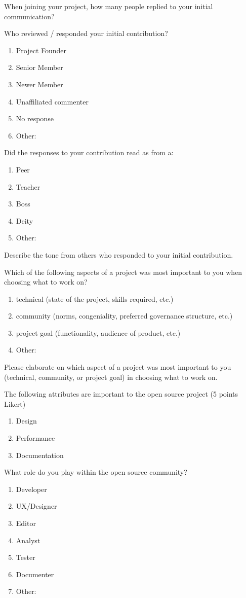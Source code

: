 \begin{table}
When joining your project, how many people replied to your initial communication?

Who reviewed / responded your initial contribution?
\begin{enumerate}
\item Project Founder
\item Senior Member
\item Newer Member
\item Unaffiliated commenter
\item No response
\item Other:
\end{enumerate}

Did the responses to your contribution read as from a:
\begin{enumerate}
\item Peer
\item Teacher
\item Boss
\item Deity 
\item Other:
\end{enumerate}

Describe the tone from others who responded to your initial contribution.

Which of the following aspects of a project was most important to you when choosing what to work on?
\begin{enumerate}
\item technical (state of the project, skills required, etc.)
\item community (norms, congeniality, preferred governance structure, etc.)
\item project goal (functionality, audience of product, etc.)
\item Other:
\end{enumerate}

Please elaborate on which aspect of a project was most important to you (technical, community, or project goal) in choosing what to work on.

The following attributes are important to the open source project (5 points Likert)
\begin{enumerate}
\item Design
\item Performance
\item Documentation
\end{enumerate}

What role do you play within the open source community?
\begin{enumerate}
\item Developer
\item UX/Designer
\item Editor
\item Analyst
\item Tester
\item Documenter
\item Other:
\end{enumerate}


\end{table}
